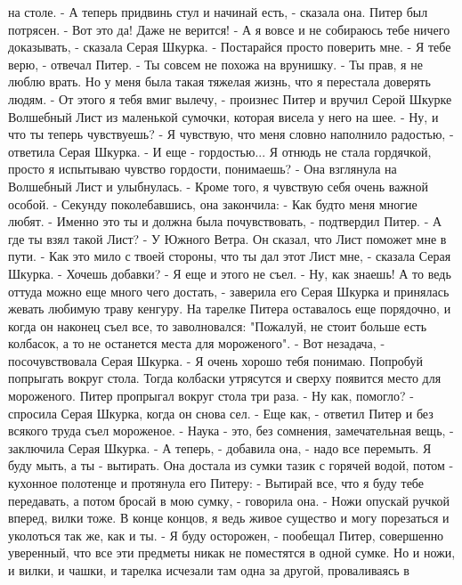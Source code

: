 на столе.
    - А теперь придвинь стул и начинай есть, - сказала она.
    Питер был потрясен.
    - Вот это да! Даже не верится!
    - А я вовсе и не собираюсь тебе ничего доказывать, - сказала Серая 
Шкурка. - Постарайся просто поверить мне.
    - Я тебе верю, - отвечал Питер. - Ты совсем не похожа на врунишку.
    - Ты прав, я не люблю врать. Но у меня была такая тяжелая жизнь, 
что я перестала доверять людям.
    - От этого я тебя вмиг вылечу, - произнес Питер и вручил Серой 
Шкурке Волшебный Лист из маленькой сумочки, которая висела у него на 
шее. - Ну, и что ты теперь чувствуешь?
    - Я чувствую, что меня словно наполнило радостью, - ответила Серая 
Шкурка. - И еще - гордостью... Я отнюдь не стала гордячкой, просто я 
испытываю чувство гордости, понимаешь? - Она взглянула на Волшебный 
Лист и улыбнулась. - Кроме того, я чувствую себя очень важной особой. 
- Секунду поколебавшись, она закончила: - Как будто меня многие любят.
    - Именно это ты и должна была почувствовать, - подтвердил Питер.
    - А где ты взял такой Лист?
    - У Южного Ветра. Он сказал, что Лист поможет мне в пути.
    - Как это мило с твоей стороны, что ты дал этот Лист мне, - 
сказала Серая Шкурка. - Хочешь добавки?
    - Я еще и этого не съел.
    - Ну, как знаешь! А то ведь оттуда можно еще много чего достать, - 
заверила его Серая Шкурка и принялась жевать любимую траву кенгуру.
    На тарелке Питера оставалось еще порядочно, и когда он наконец 
съел все, то заволновался: "Пожалуй, не стоит больше есть колбасок, а 
то не останется места для мороженого".
    - Вот незадача, - посочувствовала Серая Шкурка. - Я очень хорошо 
тебя понимаю. Попробуй попрыгать вокруг стола. Тогда колбаски 
утрясутся и сверху появится место для мороженого.
    Питер пропрыгал вокруг стола три раза.
    - Ну как, помогло? - спросила Серая Шкурка, когда он снова сел.
    - Еще как, - ответил Питер и без всякого труда съел мороженое.
    - Наука - это, без сомнения, замечательная вещь, - заключила Серая 
Шкурка. - А теперь, - добавила она, - надо все перемыть. Я буду мыть, 
а ты - вытирать.
    Она достала из сумки тазик с горячей водой, потом - кухонное 
полотенце и протянула его Питеру: - Вытирай все, что я буду тебе 
передавать, а потом бросай в мою сумку, - говорила она. - Ножи опускай 
ручкой вперед, вилки тоже. В конце концов, я ведь живое существо и 
могу порезаться и уколоться так же, как и ты.
    - Я буду осторожен, - пообещал Питер, совершенно уверенный, что 
все эти предметы никак не поместятся в одной сумке. Но и ножи, и 
вилки, и чашки, и тарелка исчезали там одна за другой, проваливаясь в 
